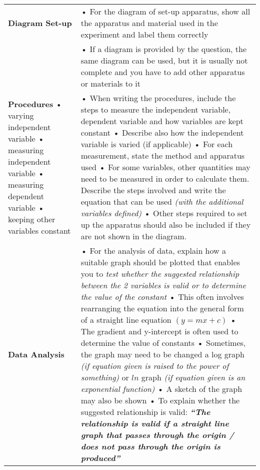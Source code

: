 \documentclass{article}
\begin{document}
\begin{longtable}{|p{5cm}|p{11.5cm}|}
    \hline  
   \textbf{Diagram Set-up}&•	For the diagram of set-up apparatus, show all the apparatus and material used in the experiment and label them correctly\\
    &•	If a diagram is provided by the question, the same diagram can be used, but it is usually not complete and you have
    to add other apparatus or materials to it\\
    \hline
    \textbf{Procedures}\newline
    •	varying	independent variable\newline
    •	measuring independent variable\newline
    •	measuring	dependent variable\newline
    •	keeping other variables constant
    &•	When writing the procedures, include the steps to measure the independent variable, dependent variable and how variables are kept constant\newline
    •	Describe also how the independent variable is varied (if applicable)\newline
    •	For each measurement, state the method and apparatus used\newline
    •	For some variables, other quantities may need to be
    measured in order to calculate them. Describe the steps involved and write the equation that can be used \textit{(with the additional variables defined)} \newline
    •	Other steps required to set up the apparatus should also be
    included if they are not shown in the diagram.\\
    \hline
    \textbf{Data Analysis}&•	For the analysis of data, explain how a suitable graph should be plotted that enables you to \textit{test whether the suggested relationship between the 2 variables is valid or to determine the value of the constant}\newline
    •	This often involves rearranging the equation into the general form of a straight line equation $(y=mx+c)$\newline
    •	The gradient and y-intercept is often used to determine the value of constants\newline
    •	Sometimes, the graph may need to be changed a log graph \textit{(if equation given is raised to the power of something)} or $ln$ graph \textit{(if equation given is an exponential function)}\newline
    •	A sketch of the graph may also be shown\newline
    •	To explain whether the suggested relationship is valid: \textbf{\textit{“The relationship is valid if a straight line graph that passes through the origin / does not pass through the origin is produced”}}\newline

\end{longtable}
\end{document}
